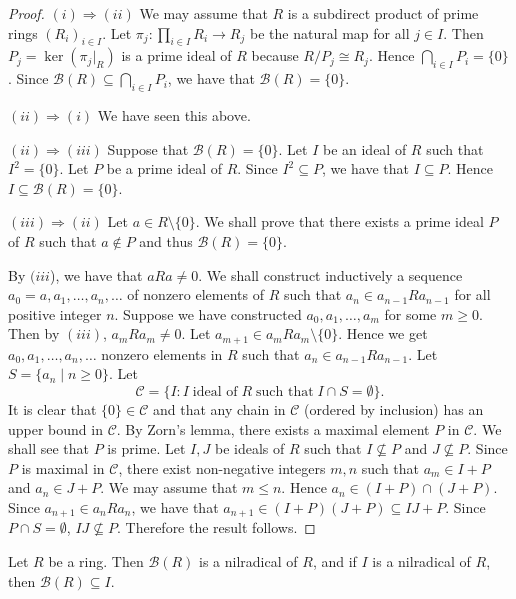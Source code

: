 \begin{proof}
$(i)\Rightarrow (ii)$ We may assume that $R$ is a subdirect product of prime rings $(R_i)_{i\in I}$. Let $\pi_j\colon\prod_{i\in I}R_i\rightarrow R_j$ be the natural map for all $j\in I$. Then $P_j=\ker(\pi_j|_R)$ is a prime ideal of $R$ because $R/P_j\cong R_j$.
Hence $\bigcap_{i\in I}P_i=\{0\}$. Since $\mathcal{B}(R)\subseteq \bigcap_{i\in I}P_i$, we have that $\mathcal{B}(R)=\{0\}$.

$(ii)\Rightarrow (i)$ We have seen this above.


$(ii)\Rightarrow (iii)$ Suppose that $\mathcal{B}(R)=\{0\}$. Let $I$ be an ideal of $R$ such that $I^2=\{0\}$.
Let $P$ be a prime ideal of $R$. Since  $I^2\subseteq P$, we have that
$I\subseteq P$. Hence $I\subseteq \mathcal{B}(R)=\{0\}$.

$(iii)\Rightarrow (ii)$ Let $a\in R\setminus\{ 0\}$. We shall prove that there exists a prime ideal $P$ of $R$
such that $a\notin P$ and thus $\mathcal{B}(R)=\{0\}$.

By $(iii$), we have that $aRa\neq 0$. We shall construct inductively a sequence $a_0=a,a_1,\dots ,a_n,\dots$ of nonzero elements of $R$ such that
$a_n\in a_{n-1}Ra_{n-1}$ for all positive integer $n$. Suppose we have constructed
 $a_0,a_1,\dots,a_m$ for some $m\geq 0$. Then by $(iii)$,
$a_mRa_m\neq 0$. Let $a_{m+1}\in a_mRa_m\setminus\{ 0\}$. Hence we get $a_0,a_1,\dots,a_n,\dots$ nonzero elements in $R$
such that $a_n\in a_{n-1}Ra_{n-1}$. Let $S=\{ a_n\mid n\geq
0\}$. Let
$$\mathcal{C}=\{ I : I\;\mbox{ideal of}\; R\;\mbox{such that}\; I\cap
S=\emptyset \} .$$
It is clear that $\{0\}\in \mathcal{C}$ and that any chain in $\mathcal{C}$ (ordered by inclusion) has an upper bound in $\mathcal{C}$.
By Zorn's lemma, there exists a maximal element $P$ in $\mathcal{C}$. We shall see that $P$ is prime. Let $I,J$ be ideals
of $R$ such that $I\not\subseteq P$ and $J\not\subseteq P$. Since $P$
is maximal in $\mathcal{C}$, there exist non-negative integers $m,n$ such that
$a_m\in I+P$ and $a_n\in J+P$. We may assume that $m\leq n$. Hence
$a_n\in (I+P)\cap (J+P)$. Since $a_{n+1}\in a_nRa_n$, we have that
$a_{n+1}\in (I+P)(J+P)\subseteq IJ+P$. Since $P\cap S=\emptyset$,
$IJ\not\subseteq P$. Therefore the result follows.  
\end{proof}

\begin{proposition}\label{Prop1.3.7}
Let $R$ be a ring. Then $\mathcal{B}(R)$ is a nilradical of $R$, and
if $I$ is a nilradical of $R$, then $\mathcal{B}(R)\subseteq I$.
\end{proposition}

